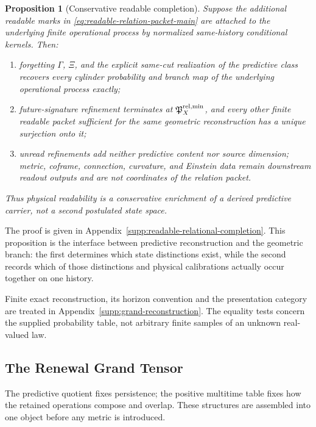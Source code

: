 \documentclass[11pt]{article}
\numberwithin{equation}{section}
\newtheorem{proposition}[proposition]{Proposition}
\theoremstyle{definition}
\theoremstyle{remark}
\begin{document}
\begin{proposition}[Conservative readable completion]
\label{prop:readable-relational-completion}
Suppose the additional readable marks in
\eqref{eq:readable-relation-packet-main} are attached to the underlying finite
operational process by normalized same-history conditional kernels.  Then:
\begin{enumerate}[label=\textup{(\roman*)},leftmargin=2.8em]
\item forgetting $\Gamma$, $\Xi$, and the explicit same-cut realization of the
      predictive class recovers every cylinder probability and branch map of
      the underlying operational process exactly;
\item future-signature refinement terminates at
      $\mathfrak P_X^{\rm rel,min}$, and every other finite readable packet
      sufficient for the same geometric reconstruction has a unique surjection onto
      it;
\item unread refinements add neither predictive content nor source dimension;
      metric, coframe, connection, curvature, and Einstein data remain
      downstream readout outputs and are not coordinates of the relation
      packet.
\end{enumerate}
Thus physical readability is a conservative enrichment of a derived
predictive carrier, not a second postulated state space.
\end{proposition}

The proof is given in Appendix~\ref{supp:readable-relational-completion}.  This
proposition is the interface between predictive reconstruction and the
geometric branch: the first determines which state distinctions exist, while
the second records which of those distinctions and physical calibrations
actually occur together on one history.

Finite exact reconstruction, its horizon convention and the presentation
category are treated in Appendix~\ref{supp:grand-reconstruction}.
The equality tests concern the supplied probability table, not arbitrary
finite samples of an unknown real-valued law.

\subsection{The Renewal Grand Tensor}

The predictive quotient fixes persistence; the positive multitime table
fixes how the retained operations compose and overlap. These structures
are assembled into one object before any metric is introduced.
\end{document}
